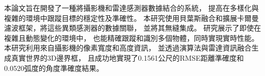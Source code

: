 
\begin{zhAbstract}
    本論文旨在開發了一種將攝影機和雷達感測器數據結合的系統，
    提高在多樣化與複雜的環境中跟蹤目標的穩定性及準確性。
    本研究使用貝葉斯融合和擴展卡爾曼濾波框架，將這些異類感測器的數據關聯，
    並將其無縫集成。
    研究展示了即使在複雜且動態變化的環境中，
    也能精確跟蹤和識別多個物體，同時實現實時性能。
    本研究利用來自攝影機的像素寬度和高度資訊，
    並透過演算法與雷達資訊融合生成真實世界的3D邊界框，
    且成功地實現了0.1561公尺的RMSE距離準確度和0.0520弧度的角度準確度結果。

    \zhAbsKeywords
\end{zhAbstract}
